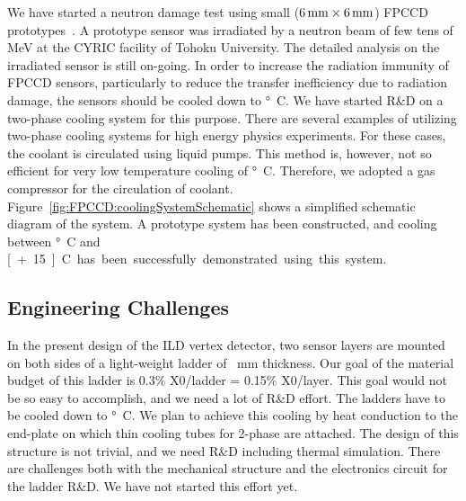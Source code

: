 We have started a neutron damage test using small ($\unit[6]{mm}\times\unit[6]{mm}$) FPCCD prototypes~\cite{lcws:fpccd:ito:2013}. A prototype sensor was irradiated by a neutron beam of few tens of MeV at the CYRIC facility of Tohoku University. The detailed analysis on the irradiated sensor is still on-going.
In order to increase the radiation immunity of FPCCD sensors, particularly to reduce the transfer inefficiency due to radiation damage, the sensors should be cooled down to \unit[-40]{\degree C}. We have started R\&D on a two-phase  cooling system for this purpose. There are several examples of utilizing two-phase  cooling systems for high energy physics experiments. For these cases, the  coolant is circulated using liquid pumps. This method is, however, not so efficient for very low temperature cooling of \unit[-40]{\degree C}. Therefore, we adopted a  gas compressor for the circulation of  coolant. Figure~\ref{fig:FPCCD:coolingSystemSchematic} shows a simplified schematic diagram of the system. A prototype system has been constructed, and cooling between \unit[-40]{\degree C} and \unit[+15]{\degree C} has been successfully demonstrated using this system.

\subsection{Engineering Challenges}
    In the present design of the ILD vertex detector, two sensor layers are mounted on both sides of a light-weight ladder of ~\unit[2]{mm} thickness. Our goal of the material budget of this ladder is 0.3\% X0/ladder = 0.15\% X0/layer. This goal would not be so easy to accomplish, and we need a lot of R\&D effort.
    The ladders have to be cooled down to \unit[-40]{\degree C}. We plan to achieve this cooling by heat conduction to the end-plate on which thin cooling tubes for 2-phase  are attached. The design of this structure is not trivial, and we need R\&D including thermal simulation.
    There are challenges both with the mechanical structure and the electronics circuit for the ladder R\&D. We have not started this effort yet.
